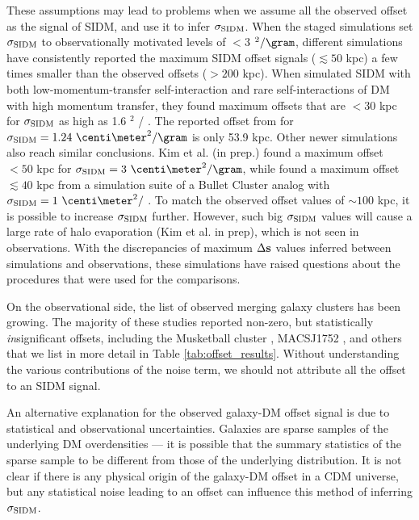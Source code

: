These assumptions may lead to problems when we assume all the observed offset
as the signal of SIDM, and use it to infer $\sigma_{\rm SIDM}$.  
When the staged simulations set $\sigma_{\rm SIDM}$ to observationally motivated 
levels of $< 3$ \centi\meter$^2 / \gram$, 
different simulations have consistently reported the maximum SIDM offset signals ($\lesssim
50$ kpc) a few times smaller than the observed offsets ($ > 200$ kpc). 
When \cite{Kahlhoefer14} simulated SIDM with both low-momentum-transfer 
self-interaction 
and rare self-interactions of DM with high momentum transfer, they found maximum 
offsets that are $< 30$ kpc for $\sigma_{\rm SIDM}$ as high as 1.6 \centi\meter$^2$ / \gram.
The reported offset from \cite{Randall2008d}
for $\sigmaSIDM = 1.24~\centi\meter^2 / \gram$ is only 53.9 kpc. 
Other newer simulations also reach similar conclusions.
Kim et al. (in prep.) found a maximum offset $< 50$ kpc for 
$\sigmaSIDM = 3~\centi\meter^2 / \gram$, while
\cite{Robertson2016} found a maximum offset $\lesssim 40$ kpc  
 from a simulation suite of a Bullet Cluster analog 
 with $\sigmaSIDM = 1~\centi\meter^2 /$ \gram.
To match the observed offset values of $\sim 100$ kpc, it is possible 
to increase $\sigma_{\rm SIDM}$ further. However, such big $\sigma_{\rm SIDM}$ values will
cause a large rate of halo evaporation (Kim et al. in prep), which is not seen
in observations.
With the discrepancies of maximum $\Delta {\bf s}$ values inferred between simulations and observations,
these simulations have raised questions about the procedures that were used for
the comparisons.

On the observational side, the list of observed merging galaxy 
clusters has been growing.
The majority of these studies reported non-zero,
but statistically {\it in}significant offsets, including the Musketball cluster
\citep{Dawson2013}, MACSJ1752 \citep{Jee2015}, 
and others that we list in more detail in Table \ref{tab:offset_results}.
Without understanding the various contributions of the noise term, 
we should not attribute all the offset to an SIDM signal. 

An alternative explanation for the observed galaxy-DM offset signal is due to 
statistical and observational uncertainties. Galaxies are
sparse samples of the underlying DM overdensities --- it is possible that the 
summary statistics of the sparse sample to be different from those of the 
underlying distribution. It is not clear if there is any physical
origin of the galaxy-DM offset in a CDM universe, 
but any statistical noise leading to an offset can influence this method of 
inferring $\sigma_{\rm SIDM}$. 

